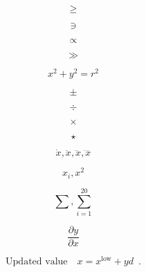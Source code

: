 \documentclass[a4paper]{article}
\begin{document}
    \begin{equation}
        \geq   
    \end{equation}

    \begin{equation}
        \ni 
    \end{equation}

    \begin{equation}
        \propto
    \end{equation}

    \begin{equation}
        \gg
    \end{equation}


    \begin{equation}
    x^2 + y^2 = r^2
    \label{eq:circ}
    \end{equation}

    \begin{equation}
        \pm
    \end{equation}

    \begin{equation}
        \div 
    \end{equation}

    \begin{equation}
        \times
    \end{equation}

    \begin{equation}
        \star
    \end{equation}

    
    \begin{equation}
        \dot{x}, \ddot{x}, \dddot{x}, \ddddot{x} 
    \end{equation}

    \begin{equation}
        x_i, x^2 
    \end{equation}

    \begin{equation}
        \sum, \sum_{i=1}^{20}
    \end{equation}

    \begin{equation}
	\frac{\partial{y}}{\partial{x}}
    \end{equation}

    \begin{equation*}
        \mbox{Updated value}\quad x =
        x^\mathrm{low} + yd \enspace .
    \end{equation*}
\end{document}
